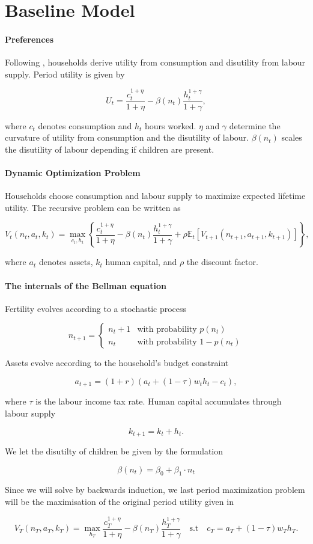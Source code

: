 \section{Baseline Model}

\paragraph{Preferences}

Following \textcite{Keane2016}, households derive utility from consumption and disutility from labour supply. Period utility is given by

\[
U_t =
\frac{c_t^{1+\eta}}{1+\eta}
-
\beta(n_t)\frac{h_t^{1+\gamma}}{1+\gamma},
\]

where $c_t$ denotes consumption and $h_t$ hours worked. $\eta$ and $\gamma$ determine the curvature of utility from consumption and the disutility of labour. $\beta(n_t)$ scales the disutility of labour depending if children are present.

\paragraph{Dynamic Optimization Problem}

Households choose consumption and labour supply to maximize expected lifetime utility. The recursive problem can be written as

\[
V_t(n_t,a_t,k_t)
=
\max_{c_t,h_t}
\left\{
\frac{c_t^{1+\eta}}{1+\eta}
-
\beta(n_t)\frac{h_t^{1+\gamma}}{1+\gamma}
+
\rho \mathbb{E}_t
\left[
V_{t+1}(n_{t+1},a_{t+1},k_{t+1})
\right]
\right\},
\]

where $a_t$ denotes assets, $k_t$ human capital, and $\rho$ the discount factor.

\paragraph{The internals of the Bellman equation}

Fertility evolves according to a stochastic process

\[
n_{t+1} =
\begin{cases}
n_t + 1 & \text{with probability } p(n_t) \\
n_t & \text{with probability } 1 - p(n_t)
\end{cases}
\]

Assets evolve according to the household's budget constraint

\[
a_{t+1} = (1+r)(a_t + (1-\tau)w_t h_t - c_t),
\]

where $\tau$ is the labour income tax rate. Human capital accumulates through labour supply

\[
k_{t+1} = k_t + h_t.
\]

We let the disutilty of children be given by the formulation

\[\beta(n_t)=\beta_0+\beta_1\cdot n_t\]

Since we will solve by backwards induction, we last period maximization problem will be the maximisation of the original period utility given in \cite{Keane2016}

\[V_{T}(n_T,a_T,k_T)=\max_{h_{T}}\frac{c_{T}^{1+\eta}}{1+\eta}-\beta(n_T)\frac{h_{T}^{1+\gamma}}{1+\gamma} \quad \text{s.t} \quad 
c_T = a_{T}+(1-\tau)w_{T}h_{T}.
\]